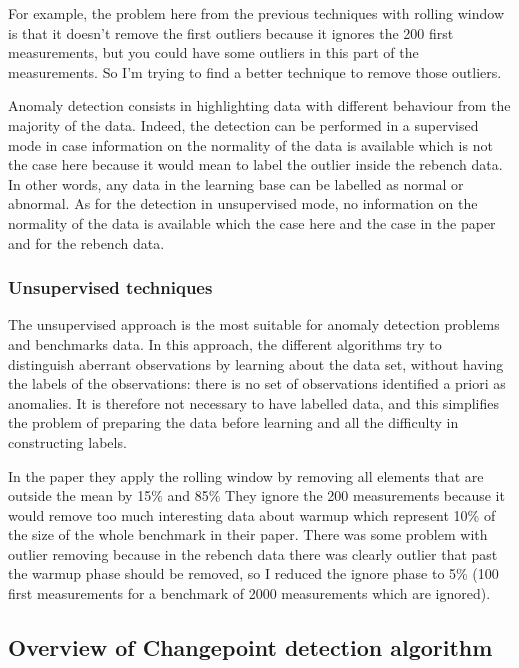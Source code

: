 \documentclass{article}
\begin{document}
For example, the problem here from the previous techniques with rolling window is that it doesn't remove the first outliers because it ignores the 200 first measurements, but you could have some outliers in this part of the measurements. So I'm trying to find a better technique to remove those outliers.

Anomaly detection consists in highlighting data with different behaviour from the majority of the data. 
Indeed, the detection can be performed in a supervised mode in case information on the normality of the data is available which is not the case here because it would mean to label the outlier inside the rebench data. In other words, any data in the learning base can be labelled as normal or abnormal.
As for the detection in unsupervised mode, no information on the normality of the data is available which the case here and the case in the \cite{barrett2017virtual} paper and for the rebench data. 

\subsubsection{Unsupervised techniques}
The unsupervised approach is the most suitable for anomaly detection problems and benchmarks data. In this approach, the different algorithms try to distinguish aberrant observations by learning about the data set, without having the labels of the observations: there is no set of observations identified a priori as anomalies. It is therefore not necessary to have labelled data, and this simplifies the problem of preparing the data before learning and all the difficulty in constructing labels.

In the paper they apply the rolling window by removing all elements that are outside the mean by 15\% and 85\% They ignore the 200 measurements because it would remove too much interesting data about warmup which represent 10\% of the size of the whole benchmark in their paper. There was some problem with outlier removing because in the rebench data there was clearly outlier that past the warmup phase should be removed, so I reduced the ignore phase to 5\% (100 first measurements for a benchmark of 2000 measurements which are ignored).



\subsection{Overview of Changepoint detection algorithm}
\end{document}
